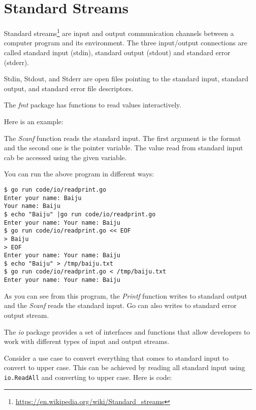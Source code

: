 \section{Standard Streams}

Standard streams\footnote{\url{https://en.wikipedia.org/wiki/Standard_streams}}
are input and output communication channels between a computer program and its
environment. The three input/output connections are called standard input
(stdin), standard output (stdout) and standard error (stderr).

Stdin, Stdout, and Stderr are open files pointing to the standard input,
standard output, and standard error file descriptors.

The \textit{fmt} package has functions to read values
interactively.

Here is an example:



The \textit{Scanf} function reads the standard input. The first argument is the
format and the second one is the pointer variable. The value read from standard
input cab be accessed using the given variable.

You can run the above program in different ways:

\begin{lstlisting}[numbers=none]
$ go run code/io/readprint.go
Enter your name: Baiju
Your name: Baiju
$ echo "Baiju" |go run code/io/readprint.go
Enter your name: Your name: Baiju
$ go run code/io/readprint.go << EOF
> Baiju
> EOF
Enter your name: Your name: Baiju
$ echo "Baiju" > /tmp/baiju.txt
$ go run code/io/readprint.go < /tmp/baiju.txt
Enter your name: Your name: Baiju
\end{lstlisting}

As you can see from this program, the \textit{Printf} function writes to
standard output and the \textit{Scanf} reads the standard input. Go can also
writes to standard error output stream.

The \textit{io} package provides a set of interfaces and functions that allow
developers to work with different types of input and output streams.

Consider a use case to convert everything that comes to standard input to
convert to upper case. This can be achieved by reading all standard input
using \texttt{io.ReadAll} and converting to upper case.  Here is code:



